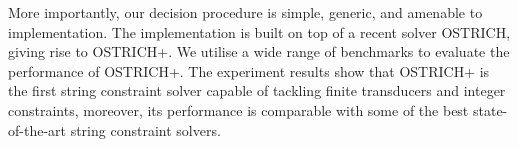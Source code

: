 More importantly, our decision procedure is simple, generic, and amenable to implementation. 
The implementation is built on top of a recent solver OSTRICH,
giving rise to OSTRICH+.
We utilise a wide range of benchmarks to evaluate the performance of OSTRICH+. The experiment results show that OSTRICH+ is the first string constraint solver capable of tackling finite transducers and integer constraints, moreover,
its performance is comparable with some of the best state-of-the-art string constraint solvers.
